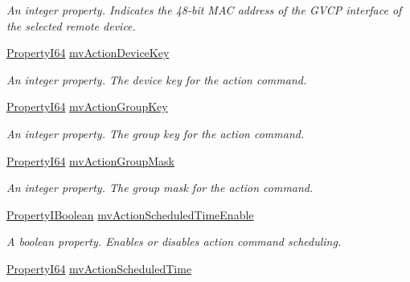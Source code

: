 \begin{DoxyCompactItemize}
\begin{DoxyCompactList}\small\item\em An integer property. Indicates the 48-\/bit M\+A\+C address of the G\+V\+C\+P interface of the selected remote device. \end{DoxyCompactList}\item 
\hyperlink{group___common_interface_ga81749b2696755513663492664a18a893}{Property\+I64} \hyperlink{classmv_i_m_p_a_c_t_1_1acquire_1_1_gen_i_cam_1_1_interface_module_a55cb974e8f118c77d0b78ec0f9e55f7f}{mv\+Action\+Device\+Key}
\begin{DoxyCompactList}\small\item\em An integer property. The device key for the action command. \end{DoxyCompactList}\item 
\hyperlink{group___common_interface_ga81749b2696755513663492664a18a893}{Property\+I64} \hyperlink{classmv_i_m_p_a_c_t_1_1acquire_1_1_gen_i_cam_1_1_interface_module_aa76eeb62205a5a0374c6f472daea7999}{mv\+Action\+Group\+Key}
\begin{DoxyCompactList}\small\item\em An integer property. The group key for the action command. \end{DoxyCompactList}\item 
\hyperlink{group___common_interface_ga81749b2696755513663492664a18a893}{Property\+I64} \hyperlink{classmv_i_m_p_a_c_t_1_1acquire_1_1_gen_i_cam_1_1_interface_module_acc6eccc0403bf6b7b5ea6cee07d5f77e}{mv\+Action\+Group\+Mask}
\begin{DoxyCompactList}\small\item\em An integer property. The group mask for the action command. \end{DoxyCompactList}\item 
\hyperlink{group___common_interface_ga44f9437e24b21b6c93da9039ec6786aa}{Property\+I\+Boolean} \hyperlink{classmv_i_m_p_a_c_t_1_1acquire_1_1_gen_i_cam_1_1_interface_module_aa47f8bb572ffa118eaf8196342b405a3}{mv\+Action\+Scheduled\+Time\+Enable}
\begin{DoxyCompactList}\small\item\em A boolean property. Enables or disables action command scheduling. \end{DoxyCompactList}\item 
\hyperlink{group___common_interface_ga81749b2696755513663492664a18a893}{Property\+I64} \hyperlink{classmv_i_m_p_a_c_t_1_1acquire_1_1_gen_i_cam_1_1_interface_module_abf03846f45ce7ca7988b9c45259bdba4}{mv\+Action\+Scheduled\+Time}

\end{DoxyCompactItemize}
